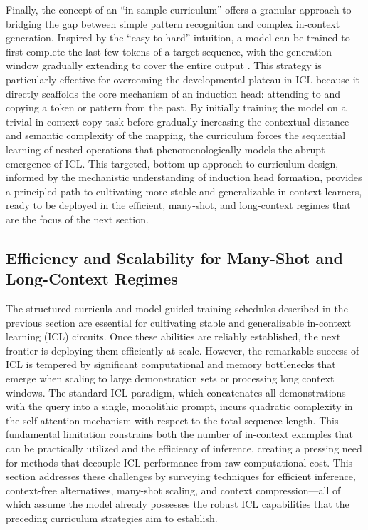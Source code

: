 \documentclass[11pt]{article}
\begin{document}
Finally, the concept of an ``in-sample curriculum'' offers a granular approach to bridging the gap between simple pattern recognition and complex in-context generation. Inspired by the ``easy-to-hard'' intuition, a model can be trained to first complete the last few tokens of a target sequence, with the generation window gradually extending to cover the entire output \cite{ref204}. This strategy is particularly effective for overcoming the developmental plateau in ICL because it directly scaffolds the core mechanism of an induction head: attending to and copying a token or pattern from the past. By initially training the model on a trivial in-context copy task before gradually increasing the contextual distance and semantic complexity of the mapping, the curriculum forces the sequential learning of nested operations that phenomenologically models the abrupt emergence of ICL. This targeted, bottom-up approach to curriculum design, informed by the mechanistic understanding of induction head formation, provides a principled path to cultivating more stable and generalizable in-context learners, ready to be deployed in the efficient, many-shot, and long-context regimes that are the focus of the next section.

\subsection{Efficiency and Scalability for Many-Shot and Long-Context Regimes}

The structured curricula and model-guided training schedules described in the previous section are essential for cultivating stable and generalizable in-context learning (ICL) circuits. Once these abilities are reliably established, the next frontier is deploying them efficiently at scale. However, the remarkable success of ICL is tempered by significant computational and memory bottlenecks that emerge when scaling to large demonstration sets or processing long context windows. The standard ICL paradigm, which concatenates all demonstrations with the query into a single, monolithic prompt, incurs quadratic complexity in the self-attention mechanism with respect to the total sequence length. This fundamental limitation constrains both the number of in-context examples that can be practically utilized and the efficiency of inference, creating a pressing need for methods that decouple ICL performance from raw computational cost. This section addresses these challenges by surveying techniques for efficient inference, context-free alternatives, many-shot scaling, and context compression---all of which assume the model already possesses the robust ICL capabilities that the preceding curriculum strategies aim to establish.
\end{document}

